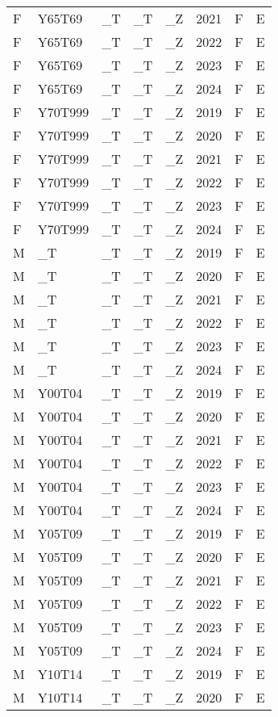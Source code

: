 \begin{longtable}[t]{llllllll}
F & Y65T69 & \_T & \_T & \_Z & 2021 & F & E\\
F & Y65T69 & \_T & \_T & \_Z & 2022 & F & E\\
F & Y65T69 & \_T & \_T & \_Z & 2023 & F & E\\
F & Y65T69 & \_T & \_T & \_Z & 2024 & F & E\\
\addlinespace
F & Y70T999 & \_T & \_T & \_Z & 2019 & F & E\\
F & Y70T999 & \_T & \_T & \_Z & 2020 & F & E\\
F & Y70T999 & \_T & \_T & \_Z & 2021 & F & E\\
F & Y70T999 & \_T & \_T & \_Z & 2022 & F & E\\
F & Y70T999 & \_T & \_T & \_Z & 2023 & F & E\\
\addlinespace
F & Y70T999 & \_T & \_T & \_Z & 2024 & F & E\\
M & \_T & \_T & \_T & \_Z & 2019 & F & E\\
M & \_T & \_T & \_T & \_Z & 2020 & F & E\\
M & \_T & \_T & \_T & \_Z & 2021 & F & E\\
M & \_T & \_T & \_T & \_Z & 2022 & F & E\\
\addlinespace
M & \_T & \_T & \_T & \_Z & 2023 & F & E\\
M & \_T & \_T & \_T & \_Z & 2024 & F & E\\
M & Y00T04 & \_T & \_T & \_Z & 2019 & F & E\\
M & Y00T04 & \_T & \_T & \_Z & 2020 & F & E\\
M & Y00T04 & \_T & \_T & \_Z & 2021 & F & E\\
\addlinespace
M & Y00T04 & \_T & \_T & \_Z & 2022 & F & E\\
M & Y00T04 & \_T & \_T & \_Z & 2023 & F & E\\
M & Y00T04 & \_T & \_T & \_Z & 2024 & F & E\\
M & Y05T09 & \_T & \_T & \_Z & 2019 & F & E\\
M & Y05T09 & \_T & \_T & \_Z & 2020 & F & E\\
\addlinespace
M & Y05T09 & \_T & \_T & \_Z & 2021 & F & E\\
M & Y05T09 & \_T & \_T & \_Z & 2022 & F & E\\
M & Y05T09 & \_T & \_T & \_Z & 2023 & F & E\\
M & Y05T09 & \_T & \_T & \_Z & 2024 & F & E\\
M & Y10T14 & \_T & \_T & \_Z & 2019 & F & E\\
\addlinespace
M & Y10T14 & \_T & \_T & \_Z & 2020 & F & E\\

\end{longtable}
